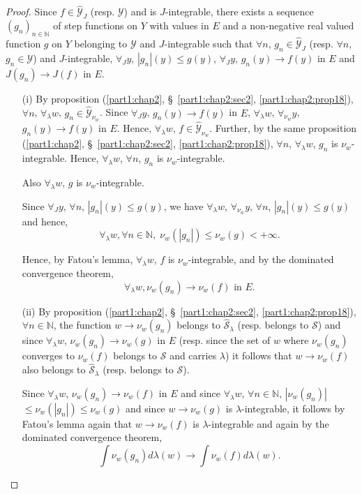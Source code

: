 \begin{proof}
Since $f \in \hat{\mathscr{Y}}_J$ (resp. $\mathscr{Y}$) and is
$J$-integrable, there exists a sequence $(g_n)_{n\in \mathbb{N}}$ of
step functions on $Y$ with values in $E$ and a non-negative real
valued function $g$ on $Y$ belonging to $\mathscr{Y}$ and
$J$-integrable such that $\forall n$, $g_n \in \hat{\mathscr{Y}}_J$
(resp. $\forall n$, $g_n \in \mathscr{Y}$) and $J$-integrable,
$\forall_J y$, $|g_n |(y) \leq g(y)$, $\forall_J y$, $g_n(y) \to f(y)$
in $E$ and $J(g_n) \to J(f)$ in $E$. 
\begin{itemize}
\item[{\rm (i)}] By proposition (\ref{part1:chap2},
  \S\ \ref{part1:chap2:sec2}, \ref{part1:chap2:prop18}), $\forall n$, 
  $\forall_\lambda w$, $g_n \in \hat{\mathscr{Y}}_{\nu_w}$. Since
  $\forall_J y$, $g_n (y) \to f(y)$ in $E$, $\forall_\lambda w$,
  $\forall_{\nu_w} y$, $g_n(y) \to f(y)$ in $E$. Hence,
  $\forall_\lambda w$, $f \in \hat{\mathscr{Y}}_{\nu_w}$. Further, by
  the same proposition (\ref{part1:chap2}, \S\ \ref{part1:chap2:sec2},
  \ref{part1:chap2:prop18}), $\forall n$, $\forall_\lambda 
  w $, $g_n$ is $\nu_w$-integrable. Hence, $\forall_\lambda w$,
  $\forall n $, $g_n$ is $\nu_w$-integrable. 

Also $\forall_\lambda w$, $g$ is $\nu_w$-integrable.

Since $\forall_J y$, $\forall n$, $|g_n| (y) \leq g(y)$, we have
$\forall_\lambda w$, $\forall_{\nu_w} y$, $\forall n$, $|g_n| (y) \leq
g(y)$ and hence, 
$$ 
\forall_\lambda w, \forall n \in \mathbb{N}, \; \nu_w (|g_n|) \leq
\nu_w (g) < + \infty.  
$$

Hence, by Fatou's lemma, $\forall_\lambda w$, $f$ is
$\nu_w$-integrable, and by the dominated  convergence\pageoriginale
theorem, 
$$
\forall_\lambda w, \nu_w (g_n) \to \nu_w (f) \text{ in } E. 
$$

\item[{\rm (ii)}] By proposition (\ref{part1:chap2},
  \S\ \ref{part1:chap2:sec2}, \ref{part1:chap2:prop18}), $\forall n
  \in 
  \mathbb{N}$, the function $w \to \nu_w (g_n)$ belongs to
  $\hat{\mathcal{S}}_\lambda$ (resp. belongs to $\mathcal{S}$) and
  since $\forall_\lambda w$, $\nu_w (g_n) \to \nu_w (g)$ in $E$
  (resp. since the set of $w$ where $\nu_w (g_n)$ converges to $\nu_w
  (f)$ belongs to $\mathcal{S}$ and carries $\lambda$) it follows that
  $w \to \nu_w(f)$ also belongs to $\hat{\mathcal{S}}_\lambda$
  (resp. belongs to $\mathcal{S}$). 

Since $\forall_\lambda w$,  $\nu_w(g_n) \to \nu_w (f)$ in $E$ and
since $\forall_\lambda w$, $\forall n \in \mathbb{N}$, $|\nu_w (g_n)|$
$\leq \nu_w (|g_n|) \leq \nu_w(g)$ and since $w \to \nu_w(g)$ is
$\lambda$-integrable, it follows by Fatou's lemma again that $w \to
\nu_w (f)$  is $\lambda$-integrable and again by the dominated
convergence theorem, 
$$
\int \nu_w (g_n) d\lambda(w) \to \int \nu_w (f) d \lambda(w). 
$$


\end{itemize}
\end{proof}
